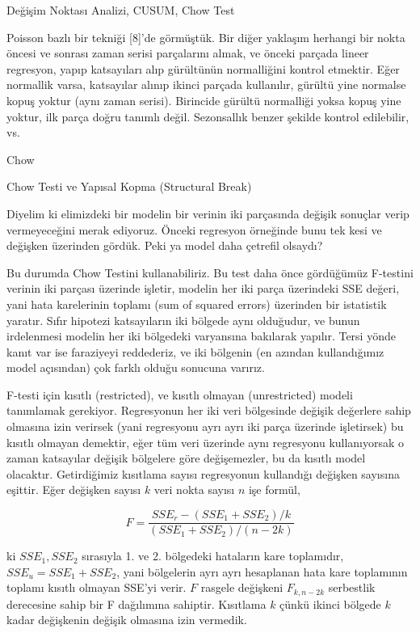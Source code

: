 \documentclass[12pt,fleqn]{article}\usepackage{../../common}
\begin{document}
Değişim Noktası Analizi, CUSUM, Chow Test

Poisson bazlı bir tekniği [8]'de görmüştük. Bir diğer yaklaşım herhangi bir
nokta öncesi ve sonrası zaman serisi parçalarını almak, ve önceki parçada lineer
regresyon, yapıp katsayıları alıp gürültünün normalliğini kontrol etmektir. Eğer
normallik varsa, katsayılar alınıp ikinci parçada kullanılır, gürültü yine
normalse kopuş yoktur (aynı zaman serisi). Birincide gürültü normalliği yoksa
kopuş yine yoktur, ilk parça doğru tanımlı değil. Sezonsallık benzer şekilde
kontrol edilebilir, vs.

Chow

Chow Testi ve Yapısal Kopma (Structural Break)

Diyelim ki elimizdeki bir modelin bir verinin iki parçasında değişik
sonuçlar verip vermeyeceğini merak ediyoruz. Önceki regresyon örneğinde
bunu tek kesi ve değişken üzerinden gördük. Peki ya model daha çetrefil
olsaydı?

Bu durumda Chow Testini kullanabiliriz. Bu test daha önce gördüğümüz
F-testini verinin iki parçası üzerinde işletir, modelin her iki parça
üzerindeki SSE değeri, yani hata karelerinin toplamı (sum of squared
errors) üzerinden bir istatistik yaratır. Sıfır hipotezi katsayıların iki
bölgede aynı olduğudur, ve bunun irdelenmesi modelin her iki bölgedeki
varyansına bakılarak yapılır. Tersi yönde kanıt var ise faraziyeyi
reddederiz, ve iki bölgenin (en azından kullandığımız model açısından) çok
farklı olduğu sonucuna varırız.

F-testi için kısıtlı (restricted), ve kısıtlı olmayan (unrestricted) modeli
tanımlamak gerekiyor. Regresyonun her iki veri bölgesinde değişik değerlere
sahip olmasına izin verirsek (yani regresyonu ayrı ayrı iki parça üzerinde
işletirsek) bu kısıtlı olmayan demektir, eğer tüm veri üzerinde aynı
regresyonu kullanıyorsak o zaman katsayılar değişik bölgelere göre
değişemezler, bu da kısıtlı model olacaktır. Getirdiğimiz kısıtlama sayısı
regresyonun kullandığı değişken sayısına eşittir. Eğer değişken sayısı $k$
veri nokta sayısı $n$ işe formül,

$$ 
F = \frac{SSE_r - (SSE_1 + SSE_2) / k}{(SSE_1 + SSE_2) / (n-2k)}
 $$

ki $SSE_1,SSE_2$ sırasıyla 1. ve 2. bölgedeki hataların kare toplamıdır, $SSE_u
= SSE_1 + SSE_2$, yani bölgelerin ayrı ayrı hesaplanan hata kare toplamının
toplamı kısıtlı olmayan SSE'yi verir. $F$ rasgele değişkeni $F_{k,n-2k}$
serbestlik derecesine sahip bir F dağılımına sahiptir. Kısıtlama $k$ çünkü
ikinci bölgede $k$ kadar değişkenin değişik olmasına izin vermedik.
\end{document}
